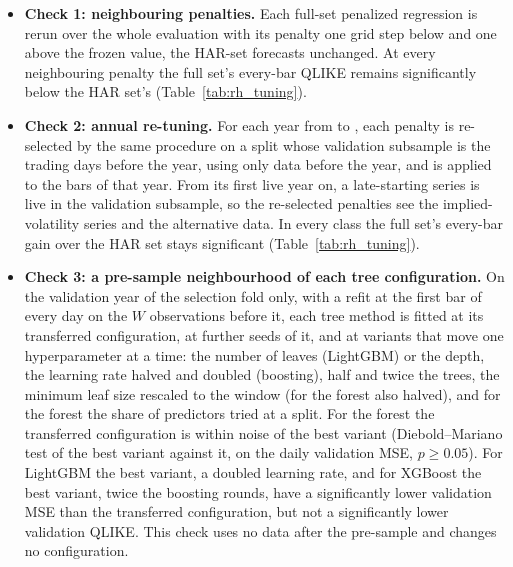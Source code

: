 \begin{itemize}
  histograms (Appendix~\ref{app:rh_methods_trees}) and is several times faster. On the selection fold its validation
  MSE is within \rhtuRfMseDiffPct{} percent of the stock forest's at the same window, %
  and its validation forecasts are nearly perfectly correlated with the stock forest's (Table~\ref{tab:rh_tuning}).
\item \textbf{Check 1: neighbouring penalties.} Each full-set penalized regression is rerun over the whole evaluation
  with its penalty one grid step below and one above the frozen value, the HAR-set forecasts unchanged. At every
  neighbouring penalty the full set's every-bar QLIKE remains significantly below the HAR set's
  (Table~\ref{tab:rh_tuning}).
\item \textbf{Check 2: annual re-tuning.} For each year from \rhtuAnnFirstYear{} to \rhtuAnnLastYear{}, %
  each penalty is re-selected by the same procedure on a split whose validation subsample is the
  \rhdmPlPreFoldSess{} trading days before the year, using only data before the year, and is applied to the bars of
  that year. From its first live year on, a late-starting series is live in the validation subsample, so the
  re-selected penalties see the implied-volatility series and the alternative data. In every class the full set's
  every-bar gain over the HAR set stays significant (Table~\ref{tab:rh_tuning}).
\item \textbf{Check 3: a pre-sample neighbourhood of each tree configuration.} On the validation year of the
  selection fold only, with a refit at the first bar of every day on the $W$ observations before it, each tree method
  is fitted at its transferred configuration, at \rhtuTreeNSeeds{} further seeds of it, %
  and at variants that move one hyperparameter at a time: the number of leaves (LightGBM) or the depth, the learning
  rate halved and doubled (boosting), half and twice the trees, the minimum leaf size rescaled to the window (for the
  forest also halved), and for the forest the share of predictors tried at a split. For the forest the transferred
  configuration is within noise of the best variant (Diebold--Mariano test of the best variant against it, on the
  daily validation MSE, $p \ge 0.05$). For LightGBM the best variant, a doubled learning rate, and for XGBoost the best
  variant, twice the boosting rounds, have a significantly lower validation MSE than the transferred configuration,
  but not a significantly lower validation QLIKE. This check uses no data after the pre-sample and changes no
  configuration.
\end{itemize}

